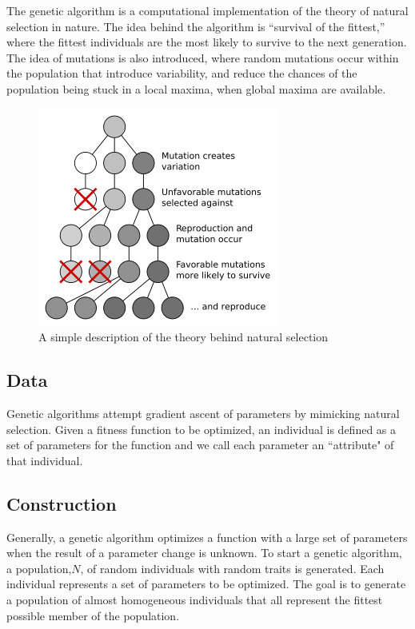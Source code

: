 \documentclass[11pt,a4paper]{article}
\begin{document}
The genetic algorithm is a computational implementation of the theory of natural selection in nature. The idea behind the algorithm is ``survival of the fittest,'' where the fittest individuals are the most likely to survive to the next generation. The idea of mutations is also introduced, where random mutations occur within the population that introduce variability, and reduce the chances of the population being stuck in a local maxima, when global maxima are available.

\begin{figure}[h]
  \begin{center}
	\includegraphics[scale=0.6]{natural_selection.png}
  \end{center}
  \caption{A simple description of the theory behind natural selection}
\end{figure}

\subsection{Data}
\label{Genetic Algorithms:Data}

Genetic algorithms attempt gradient ascent of parameters by mimicking natural selection. Given a fitness function to be optimized, an individual is defined as a set of parameters for the function and we call each parameter an ``attribute" of that individual.

\subsection{Construction}
\label{Genetic Algorithms:Construction}

Generally, a genetic algorithm optimizes a function with a large set of parameters when the result of a parameter change is unknown. To start a genetic algorithm, a population,$N$, of random individuals with random traits is generated. Each individual represents a set of parameters to be optimized. The goal is to generate a population of almost homogeneous individuals that all represent the fittest possible member of the population.
\end{document}
